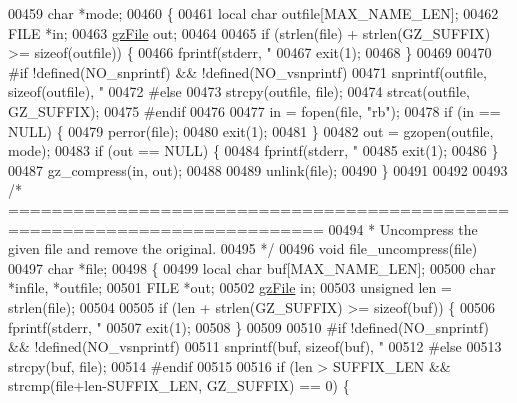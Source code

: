 \begin{DoxyCode}
{{{{00459     \textcolor{keywordtype}{char}  *mode;
00460 \{
00461     local \textcolor{keywordtype}{char} outfile[MAX\_NAME\_LEN];
00462     FILE  *in;
00463     \hyperlink{structgz_file__s}{gzFile} out;
00464 
00465     \textcolor{keywordflow}{if} (strlen(file) + strlen(GZ\_SUFFIX) >= \textcolor{keyword}{sizeof}(outfile)) \{
00466         fprintf(stderr, \textcolor{stringliteral}{"%
00467         exit(1);
00468     \}
00469 
00470 \textcolor{preprocessor}{#if !defined(NO\_snprintf) && !defined(NO\_vsnprintf)}
00471     snprintf(outfile, \textcolor{keyword}{sizeof}(outfile), \textcolor{stringliteral}{"%
00472 \textcolor{preprocessor}{#else}
00473     strcpy(outfile, file);
00474     strcat(outfile, GZ\_SUFFIX);
00475 \textcolor{preprocessor}{#endif}
00476 
00477     in = fopen(file, \textcolor{stringliteral}{"rb"});
00478     \textcolor{keywordflow}{if} (in == NULL) \{
00479         perror(file);
00480         exit(1);
00481     \}
00482     out = gzopen(outfile, mode);
00483     \textcolor{keywordflow}{if} (out == NULL) \{
00484         fprintf(stderr, \textcolor{stringliteral}{"%
00485         exit(1);
00486     \}
00487     gz\_compress(in, out);
00488 
00489     unlink(file);
00490 \}
00491 
00492 
00493 \textcolor{comment}{/* ===========================================================================}
00494 \textcolor{comment}{ * Uncompress the given file and remove the original.}
00495 \textcolor{comment}{ */}
00496 \textcolor{keywordtype}{void} file\_uncompress(file)
00497     \textcolor{keywordtype}{char}  *file;
00498 \{
00499     local \textcolor{keywordtype}{char} buf[MAX\_NAME\_LEN];
00500     \textcolor{keywordtype}{char} *infile, *outfile;
00501     FILE  *out;
00502     \hyperlink{structgz_file__s}{gzFile} in;
00503     \textcolor{keywordtype}{unsigned} len = strlen(file);
00504 
00505     \textcolor{keywordflow}{if} (len + strlen(GZ\_SUFFIX) >= \textcolor{keyword}{sizeof}(buf)) \{
00506         fprintf(stderr, \textcolor{stringliteral}{"%
00507         exit(1);
00508     \}
00509 
00510 \textcolor{preprocessor}{#if !defined(NO\_snprintf) && !defined(NO\_vsnprintf)}
00511     snprintf(buf, \textcolor{keyword}{sizeof}(buf), \textcolor{stringliteral}{"%
00512 \textcolor{preprocessor}{#else}
00513     strcpy(buf, file);
00514 \textcolor{preprocessor}{#endif}
00515 
00516     \textcolor{keywordflow}{if} (len > SUFFIX\_LEN && strcmp(file+len-SUFFIX\_LEN, GZ\_SUFFIX) == 0) \{
}}}}}}}}}
\end{DoxyCode}
